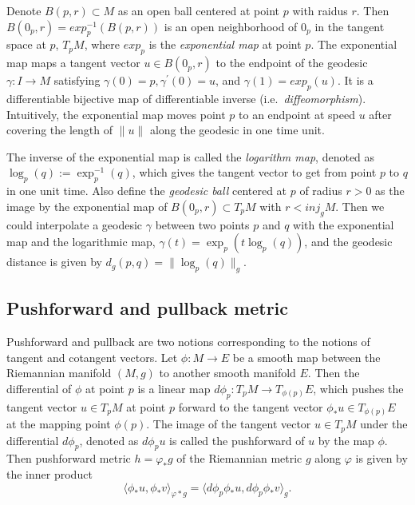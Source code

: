 \documentclass[11pt,a4paper,]{article}
\begin{document}
Denote \(B(p, r) \subset M\) as an open ball centered at point \(p\) with raidus \(r\). Then \(B(0_p, r) = exp_p^{-1}(B(p,r))\) is an open neighborhood of \(0_p\) in the tangent space at \(p\), \(T_pM\), where \(exp_p\) is the \emph{exponential map} at point \(p\). The exponential map maps a tangent vector \(u \in B(0_p, r)\) to the endpoint of the geodesic \(\gamma: I \rightarrow M\) satisfying \(\gamma(0)=p, \gamma^{\prime}(0)=u\), and \(\gamma(1)=exp_p(u)\). It is a differentiable bijective map of differentiable inverse (i.e.~\emph{diffeomorphism}). Intuitively, the exponential map moves point \(p\) to an endpoint at speed \(u\) after covering the length of \(\|u\|\) along the geodesic in one time unit.

The inverse of the exponential map is called the \emph{logarithm map}, denoted as \(\log_p(q):= \exp^{-1}_p(q)\), which gives the tangent vector to get from point \(p\) to \(q\) in one unit time. Also define the \emph{geodesic ball} centered at \(p\) of radius \(r > 0\) as the image by the exponential map of \(B(0_p, r) \subset T_pM\) with \(r < \textit{inj}_gM\). Then we could interpolate a geodesic \(\gamma\) between two points \(p\) and \(q\) with the exponential map and the logarithmic map, \(\gamma(t) = \exp_p(t\log_p(q))\), and the geodesic distance is given by \(d_g(p,q) = \|\log_p(q)\|_g\).

\hypertarget{pushforward-and-pullback-metric}{%
\subsection{Pushforward and pullback metric}\label{pushforward-and-pullback-metric}}

Pushforward and pullback are two notions corresponding to the notions of tangent and cotangent vectors.
Let \(\phi: M \rightarrow E\) be a smooth map between the Riemannian manifold \((M,g)\) to another smooth manifold \(E\). Then the differential of \(\phi\) at point \(p\) is a linear map \(d\phi_p: T_pM \rightarrow T_{\phi (p)}E\), which pushes the tangent vector \(u \in T_pM\) at point \(p\) forward to the tangent vector \(\phi_*u \in T_{\phi (p)}E\) at the mapping point \(\phi(p)\).
The image of the tangent vector \(u \in T_pM\) under the differential \(d\phi_p\), denoted as \(d\phi_p u\) is called the pushforward of \(u\) by the map \(\phi\).
Then pushforward metric \(h=\varphi_*g\) of the Riemannian metric \(g\) along \(\varphi\) is given by the inner product
\[
\langle \phi_*u,\phi_*v \rangle_{\varphi*g} = \langle d\phi_p \phi_*u, d\phi_p \phi_*v \rangle_{g}.
\]
\end{document}
